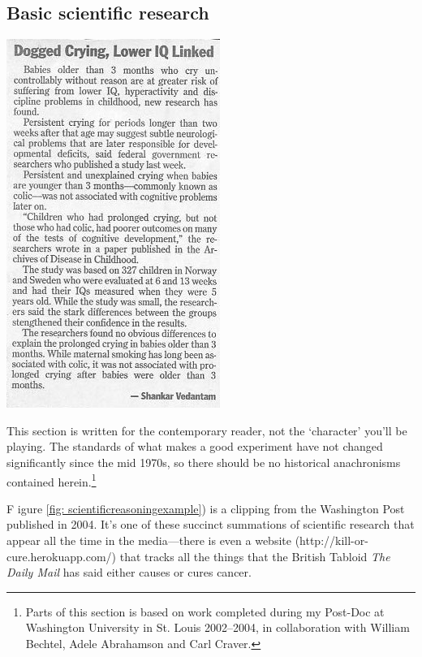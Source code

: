 \begin{refsection}
\subsection{Basic scientific research}
\label{basicscientificresearch}

\begin{marginfigure}
 \begin{center}


     \includegraphics[scale=0.50]{../images/scientificReasoning2.jpg}
\end{center}
 \caption{ ~\citep{Vedantam:2004tz}}
\label{fig: scientificreasoningexample}
\end{marginfigure}

This section is written for the contemporary reader, not the ‘character’ you’ll be playing. The standards of what makes a good experiment have not changed significantly since the mid 1970s, so there should be no historical anachronisms contained herein.\footnote{Parts of this section is based on work completed during my Post-Doc at Washington University in St. Louis 2002--2004, in collaboration with William Bechtel, Adele Abrahamson and Carl Craver.}

F igure \ref{fig: scientificreasoningexample}) is a clipping from the Washington Post published in 2004. It’s one of these succinct summations of scientific research that appear all the time in the media---there is even a website (http:\slash \slash kill-or-cure.herokuapp.com\slash ) that tracks all the things that the British Tabloid \emph{The Daily Mail} has said either causes or cures cancer.


\end{refsection}
